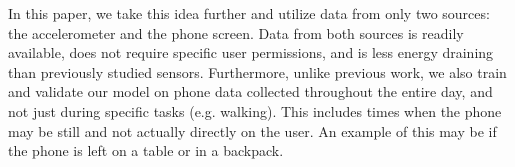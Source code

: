 In this paper, we take this idea further and utilize data from only two sources: the accelerometer and the phone screen. 
Data from both sources is readily available, does not require specific user permissions, and is less energy draining than previously studied sensors.
Furthermore, unlike previous work, we also train and validate our model on phone data collected throughout the entire day, and not just during specific tasks (e.g. walking).
This includes times when the phone may be still and not actually directly on the user.
An example of this may be if the phone is left on a table or in a backpack. 







